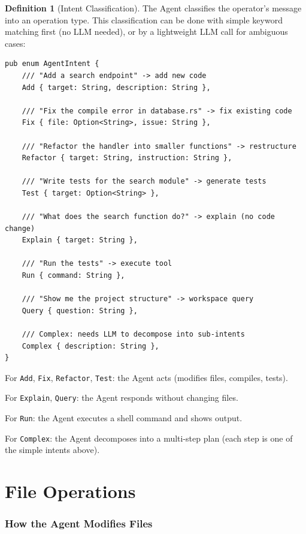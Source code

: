 \documentclass[11pt,a4paper,twoside]{article}
\theoremstyle{definition}
\newtheorem{definition}{Definition}[section]
\theoremstyle{remark}
\begin{document}
\begin{definition}[Intent Classification]\label{def:intent}
The Agent classifies the operator's message into an operation type.
This classification can be done with simple keyword matching first
(no LLM needed), or by a lightweight LLM call for ambiguous cases:

\begin{lstlisting}
pub enum AgentIntent {
    /// "Add a search endpoint" -> add new code
    Add { target: String, description: String },

    /// "Fix the compile error in database.rs" -> fix existing code
    Fix { file: Option<String>, issue: String },

    /// "Refactor the handler into smaller functions" -> restructure
    Refactor { target: String, instruction: String },

    /// "Write tests for the search module" -> generate tests
    Test { target: Option<String> },

    /// "What does the search function do?" -> explain (no code change)
    Explain { target: String },

    /// "Run the tests" -> execute tool
    Run { command: String },

    /// "Show me the project structure" -> workspace query
    Query { question: String },

    /// Complex: needs LLM to decompose into sub-intents
    Complex { description: String },
}
\end{lstlisting}

For \texttt{Add}, \texttt{Fix}, \texttt{Refactor}, \texttt{Test}:
the Agent acts (modifies files, compiles, tests).

For \texttt{Explain}, \texttt{Query}: the Agent responds without
changing files.

For \texttt{Run}: the Agent executes a shell command and shows
output.

For \texttt{Complex}: the Agent decomposes into a multi-step plan
(each step is one of the simple intents above).
\end{definition}


\part{File Operations}\label{part:fileops}

\section{How the Agent Modifies Files}\label{sec:modify}
\end{document}
